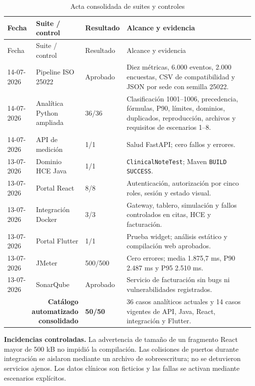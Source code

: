 \begin{longtable}{p{2.0cm}p{3.1cm}p{2.0cm}p{5.6cm}}
\caption{Acta consolidada de suites y controles}\label{tab:test-record}\\
\toprule
Fecha & Suite / control & Resultado & Alcance y evidencia \\
\midrule
\endfirsthead
\toprule
Fecha & Suite / control & Resultado & Alcance y evidencia \\
\midrule
\endhead
14-07-2026 & Pipeline ISO 25022 & Aprobado & Diez métricas, 6.000 eventos, 2.000 encuestas, CSV de compatibilidad y JSON por sede con semilla 25022. \\
14-07-2026 & Analítica Python ampliada & 36/36 & Clasificación 1001--1006, precedencia, fórmulas, P90, límites, dominios, duplicados, reproducción, archivos y requisitos de escenarios 1--8. \\
14-07-2026 & API de medición & 1/1 & Salud FastAPI; cero fallos y errores. \\
13-07-2026 & Dominio HCE Java & 1/1 & \texttt{ClinicalNoteTest}; Maven \texttt{BUILD SUCCESS}. \\
13-07-2026 & Portal React & 8/8 & Autenticación, autorización por cinco roles, sesión y estado visual. \\
13-07-2026 & Integración Docker & 3/3 & Gateway, tablero, simulación y fallos controlados en citas, HCE y facturación. \\
13-07-2026 & Portal Flutter & 1/1 & Prueba widget; análisis estático y compilación web aprobados. \\
13-07-2026 & JMeter & 500/500 & Cero errores; media 1.875,7 ms, P90 2.487 ms y P95 2.510 ms. \\
13-07-2026 & SonarQube & Aprobado & Servicio de facturación sin bugs ni vulnerabilidades registrados. \\
\midrule
\multicolumn{2}{r}{\textbf{Catálogo automatizado consolidado}} & \textbf{50/50} & 36 casos analíticos actuales y 14 casos vigentes de API, Java, React, integración y Flutter. \\
\bottomrule
\end{longtable}

\textbf{Incidencias controladas.} La advertencia de tamaño de un fragmento React mayor de 500 kB no impidió la compilación. Las colisiones de puertos durante integración se aislaron mediante un archivo de sobreescritura; no se detuvieron servicios ajenos. Los datos clínicos son ficticios y las fallas se activan mediante escenarios explícitos.


